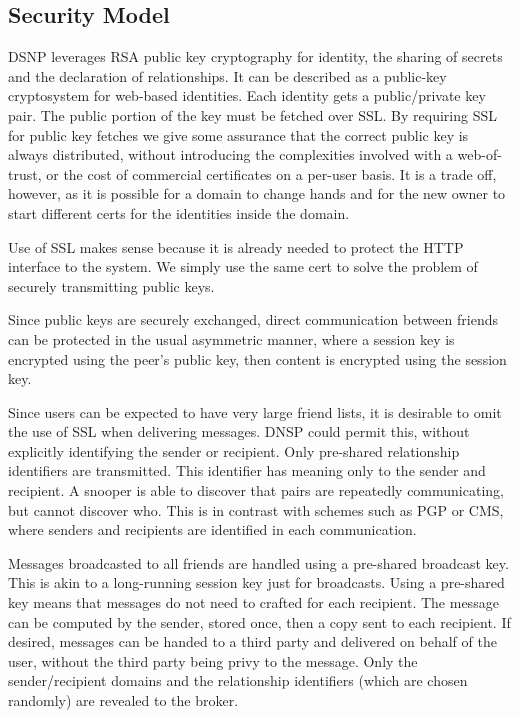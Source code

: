 \documentclass[letterpaper,11pt,oneside]{article}
\begin{document}

\subsection{Security Model}

DSNP leverages RSA public key cryptography for identity, the sharing of secrets
and the declaration of relationships. It can be described as a public-key
cryptosystem for web-based identities. Each identity gets a public/private key
pair. The public portion of the key must be fetched over SSL. By requiring SSL
for public key fetches we give some assurance that the correct public key is
always distributed, without introducing the complexities involved with a
web-of-trust, or the cost of commercial certificates on a per-user basis. It is
a trade off, however, as it is possible for a domain to change hands and for
the new owner to start different certs for the identities inside the domain.

Use of SSL makes sense because it is already needed to protect the HTTP
interface to the system. We simply use the same cert to solve the problem of
securely transmitting public keys.

Since public keys are securely exchanged, direct communication between friends
can be protected in the usual asymmetric manner, where a session key is
encrypted using the peer's public key, then content is encrypted using the
session key.

Since users can be expected to have very large friend lists, it is desirable to
omit the use of SSL when delivering messages. DNSP could permit this, without
explicitly identifying the sender or recipient. Only pre-shared relationship
identifiers are transmitted. This identifier has meaning only to the sender and
recipient. A snooper is able to discover that pairs are repeatedly
communicating, but cannot discover who. This is in contrast with schemes such
as PGP or CMS, where senders and recipients are identified in each
communication.

Messages broadcasted to all friends are handled using a pre-shared broadcast
key. This is akin to a long-running session key just for broadcasts. Using a
pre-shared key means that messages do not need to crafted for each recipient.
The message can be computed by the sender, stored once, then a copy sent to
each recipient. If desired, messages can be handed to a third party and
delivered on behalf of the user, without the third party being privy to the
message. Only the sender/recipient domains and the relationship identifiers
(which are chosen randomly) are revealed to the broker. 
\end{document}
